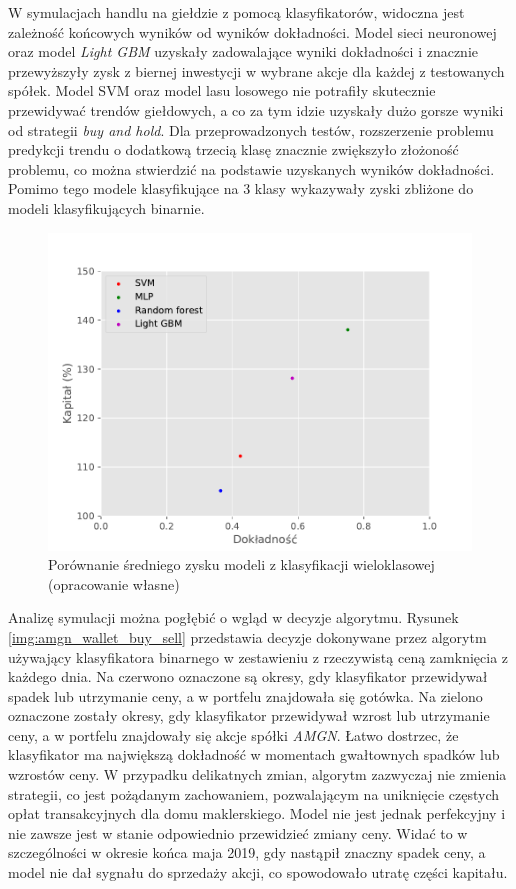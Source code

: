 \documentclass[a4paper, twoside, 11pt, openright]{article}
\begin{document}
W symulacjach handlu na giełdzie z pomocą klasyfikatorów, widoczna jest zależność końcowych wyników od wyników dokładności. Model sieci neuronowej oraz model \textit{Light GBM} uzyskały zadowalające wyniki dokładności i znacznie przewyższyły zysk z biernej inwestycji w wybrane akcje dla każdej z testowanych spółek. Model SVM oraz model lasu losowego nie potrafiły skutecznie przewidywać trendów giełdowych, a co za tym idzie uzyskały dużo gorsze wyniki od strategii \textit{buy and hold}. Dla przeprowadzonych testów, rozszerzenie problemu predykcji trendu o dodatkową trzecią klasę znacznie zwiększyło złożoność problemu, co można stwierdzić na podstawie uzyskanych wyników dokładności. Pomimo tego modele klasyfikujące na 3 klasy wykazywały zyski zbliżone do modeli klasyfikujących binarnie.

\begin{figure}[H]
\centering \includegraphics[scale=0.9]{img/summary-discrete-gain-summary.pdf}
\caption{Porównanie średniego zysku modeli z klasyfikacji wieloklasowej (opracowanie własne)}
\label{img:summary-discrete-gain}
\end{figure}

\bigskip


Analizę symulacji można pogłębić o wgląd w decyzje algorytmu. Rysunek \ref{img:amgn_wallet_buy_sell} przedstawia decyzje dokonywane przez algorytm używający klasyfikatora binarnego w zestawieniu z rzeczywistą ceną zamknięcia z każdego dnia. Na czerwono oznaczone są okresy, gdy klasyfikator przewidywał spadek lub utrzymanie ceny, a w portfelu znajdowała się gotówka. Na zielono oznaczone zostały okresy, gdy klasyfikator przewidywał wzrost lub utrzymanie ceny, a w portfelu znajdowały się akcje spółki \textit{AMGN}. Łatwo dostrzec, że klasyfikator ma największą dokładność w momentach gwałtownych spadków lub wzrostów ceny. W przypadku delikatnych zmian, algorytm zazwyczaj nie zmienia strategii, co jest pożądanym zachowaniem, pozwalającym na uniknięcie częstych opłat transakcyjnych dla domu maklerskiego. Model nie jest jednak perfekcyjny i nie zawsze jest w stanie odpowiednio przewidzieć zmiany ceny. Widać to w szczególności w okresie końca maja 2019, gdy nastąpił znaczny spadek ceny, a model nie dał sygnału do sprzedaży akcji, co spowodowało utratę części kapitału.
\end{document}
